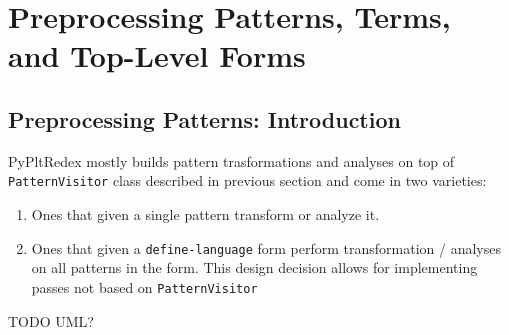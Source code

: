\chapter{Preprocessing Patterns, Terms, and Top-Level Forms}



\section{Preprocessing Patterns: Introduction}
PyPltRedex mostly builds pattern trasformations and analyses on top of \texttt{PatternVisitor} class described in previous section and come in two varieties:

\begin{enumerate}
\item Ones that given a single pattern transform or analyze it.
\item Ones that given a \texttt{define-language} form perform transformation / analyses on all patterns in the form. This design decision allows for implementing passes not based on \texttt{PatternVisitor}
\end{enumerate}

TODO UML?















